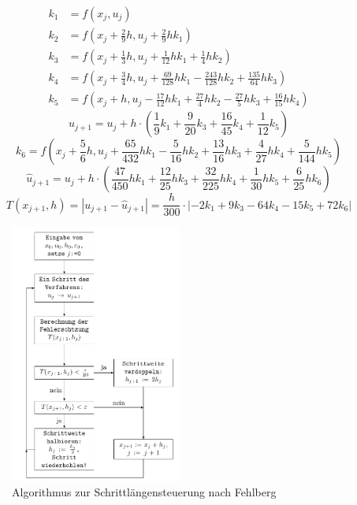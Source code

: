 \begin{align*}
  k_1 & =f(x_j, u_j)                                                                           \\
  k_2 & =f(x_j + \frac{2}{9}h, u_j+\frac{2}{9}hk_1)                                            \\
  k_3 & =f(x_j + \frac{1}{3}h, u_j+\frac{1}{12}hk_1+\frac{1}{4}hk_2)                           \\
  k_4 & =f(x_j + \frac{3}{4}h, u_j+\frac{69}{128}hk_1-\frac{243}{128}hk_2+\frac{135}{64}hk_3)  \\
  k_5 & =f(x_j + h, u_j-\frac{17}{12}hk_1+\frac{27}{4}hk_2-\frac{27}{5}hk_3+\frac{16}{15}hk_4)
\end{align*}
\[
  u_{j+1} =u_j +h\cdot(\frac{1}{9}k_1+\frac{9}{20}k_3+\frac{16}{45}k_4+\frac{1}{12}k_5)
\]
\[
  k_6 =f(x_j + \frac{5}{6}h, u_j+\frac{65}{432}hk_1-\frac{5}{16}hk_2+\frac{13}{16}hk_3+\frac{4}{27}hk_4+\frac{5}{144}hk_5)
\]
\[
  \hat{u}_{j+1} =u_j+h\cdot(\frac{47}{450}hk_1+\frac{12}{25}hk_3+\frac{32}{225}hk_4+\frac{1}{30}hk_5+\frac{6}{25}hk_6)
\]
\[
  T(x_{j+1},h)=|u_{j+1}-\hat{u}_{j+1}|=\frac{h}{300}\cdot|-2k_1+9k_3-64k_4-15k_5+72k_6|
\]


\begin{figure}
  \centering
  \includegraphics[width=0.5\textwidth]{papers/steps/img/Fehlberg_Flowchart.pdf}
  \caption{Algorithmus zur Schrittlängensteuerung nach Fehlberg
    \label{buch:steps:flowchartfehlberg}}
\end{figure}
